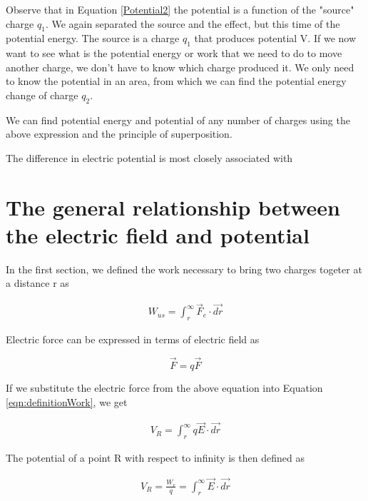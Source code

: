 \documentclass{ximera}
\begin{document}
Observe that in Equation \ref{Potential2} the potential is a function of the "source" charge $q_1$. We again separated the source and the effect, but this time of the potential energy. The source is a charge $q_1$ that produces potential V. If we now want to see what is the potential energy or work that we need to do to move another charge, we don't have to know which charge produced it. We only need to know the potential in an area, from which we can find the potential energy change of charge $q_2$. 

We can find potential energy and potential of any number of charges using the above expression and the principle of superposition. 


\begin{question}  
The difference in electric potential is most closely associated with 
\begin{multipleChoice}  
\end{multipleChoice}  
\end{question}

\section{The general relationship between the electric field and potential}

In the first section, we defined the work necessary to bring two charges togeter at a distance r as 

\begin{eqnarray}
W_{us}=  \int_{r}^{\infty} \vec{F}_{e} \cdot \vec{dr}\label{eqn:definitionWork} 
\end{eqnarray}

Electric force can be expressed in terms of electric field as

\begin{equation}
\vec{F}=q \vec{F}
\end{equation}

If we substitute the electric force from the above equation into Equation \ref{eqn:definitionWork}, we get 

\begin{eqnarray}
V_R=  \int_{r}^{\infty} q \vec{E} \cdot \vec{dr}
\end{eqnarray}

The potential of a point R with respect to infinity is then defined as 

\begin{eqnarray}
V_R=\frac{W_{e}}{q}=\int_{r}^{\infty}  \vec{E} \cdot \vec{dr}
\end{eqnarray}
\end{document}
